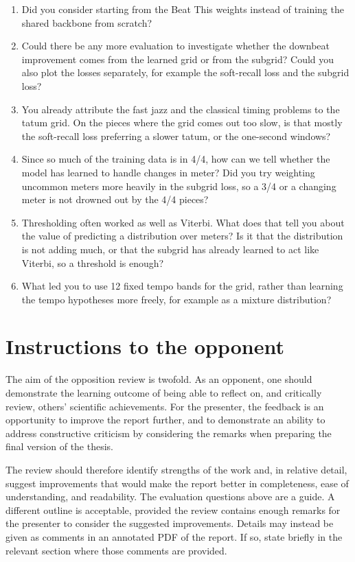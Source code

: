 \documentclass[11pt,a4paper]{article}
\begin{document}
\begin{enumerate}
  \item Did you consider starting from the Beat This weights instead of training the shared backbone from scratch?

  \item Could there be any more evaluation to investigate whether the downbeat improvement comes from the learned grid or from the subgrid? Could you also plot the losses separately, for example the soft-recall loss and the subgrid loss?

  \item You already attribute the fast jazz and the classical timing problems to the tatum grid. On the pieces where the grid comes out too slow, is that mostly the soft-recall loss preferring a slower tatum, or the one-second windows?

  \item Since so much of the training data is in 4/4, how can we tell whether the model has learned to handle changes in meter? Did you try weighting uncommon meters more heavily in the subgrid loss, so a 3/4 or a changing meter is not drowned out by the 4/4 pieces?

  \item Thresholding often worked as well as Viterbi. What does that tell you about the value of predicting a distribution over meters? Is it that the distribution is not adding much, or that the subgrid has already learned to act like Viterbi, so a threshold is enough?

  \item What led you to use 12 fixed tempo bands for the grid, rather than learning the tempo hypotheses more freely, for example as a mixture distribution?
\end{enumerate}

\newpage
\appendix
\section{Instructions to the opponent}

The aim of the opposition review is twofold. As an opponent, one should demonstrate the learning outcome of being able to reflect on, and critically review, others' scientific achievements. For the presenter, the feedback is an opportunity to improve the report further, and to demonstrate an ability to address constructive criticism by considering the remarks when preparing the final version of the thesis.

The review should therefore identify strengths of the work and, in relative detail, suggest improvements that would make the report better in completeness, ease of understanding, and readability. The evaluation questions above are a guide. A different outline is acceptable, provided the review contains enough remarks for the presenter to consider the suggested improvements. Details may instead be given as comments in an annotated PDF of the report. If so, state briefly in the relevant section where those comments are provided.
\end{document}
